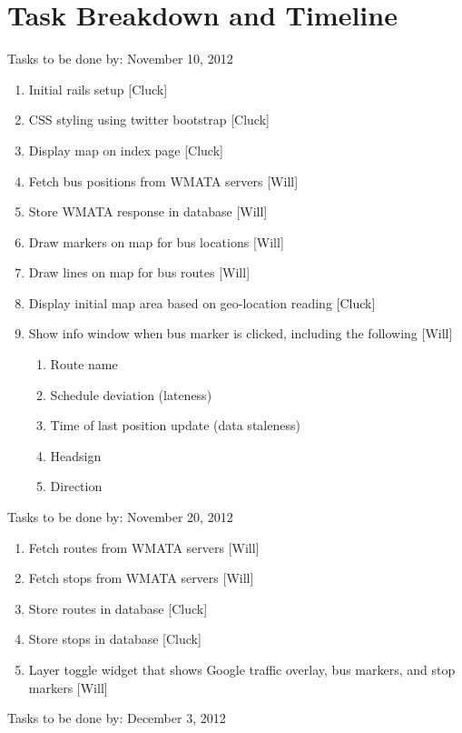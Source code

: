 \documentclass[12pt]{article}
\begin{document}
\section*{Task Breakdown and Timeline}
\begin{description}
	\item Tasks to be done by:  November 10, 2012  	
	
	\begin{enumerate}
		\item Initial rails setup [Cluck]
		\item CSS styling using twitter bootstrap [Cluck]
		\item Display map on index page [Cluck]
		\item Fetch bus positions from WMATA servers [Will]
		\item Store WMATA response in database [Will]
		\item Draw markers on map for bus locations [Will]
		\item Draw lines on map for bus routes [Will]
		\item Display initial map area based on geo-location reading [Cluck]
		\item Show info window when bus marker is clicked, including the following [Will]
		\begin{enumerate}
			\item Route name
			\item Schedule deviation (lateness)
			\item Time of last position update (data staleness)
			\item Headsign
			\item Direction
		\end{enumerate}
	\end{enumerate}
	\item Tasks to be done by: November 20, 2012
	\begin{enumerate}
		\item Fetch routes from WMATA servers [Will]
		\item Fetch stops from WMATA servers [Will]
		\item Store routes in database [Cluck]
		\item Store stops in database [Cluck]
		\item Layer toggle widget that shows Google traffic overlay, bus markers, and stop markers [Will]
	\end{enumerate}
	\item Tasks to be done by: December 3, 2012
	\begin{enumerate}

\end{enumerate}
\end{description}
\end{document}
